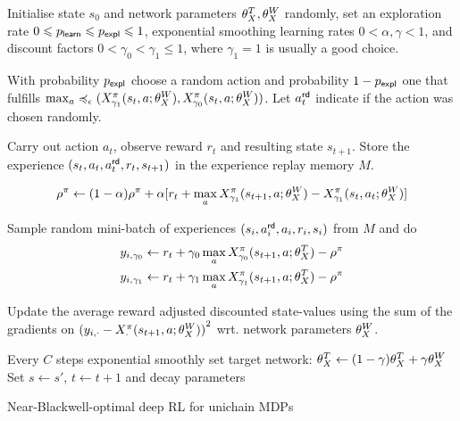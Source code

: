 \documentclass[envcountsame]{llncs}
\begin{document}
\begin{algorithm}[t!]
  \begin{algorithmic}[1]
    \State{}Initialise state \(s_{0}\) and network parameters \(\theta_X^{T}, \theta_X^{W}\) randomly, set
    an exploration rate \(0 \leqslant p_{\mathsf{learn}} \leqslant p_{\mathsf{expl}} \leqslant 1\), exponential smoothing learning rates
    \(0 < \alpha, \gamma < 1\), and discount factors
    \(0 < \gamma_{0} < \gamma_{1} \leqslant 1\), where \(\gamma_{1} = 1\) is
    usually a good choice.
    \State{}\begin{minipage}[t]{0.9\textwidth} With probability \(p_{\mathsf{expl}}\) choose a random action and
      probability \(1-p_{\mathsf{expl}}\) one that fulfills
      \(\max_{a}\preccurlyeq_{\epsilon}(X^{\pi}_{\gamma_{1}}(s_{t},a; \theta_X^{W}{}),X^\pi_ {\gamma_{0}}(s_{t},a; \theta_X^{W}{}))\). Let
      \(a_{t}^{\mathsf{rd}}\) indicate if the action was chosen randomly.
    \end{minipage}
    \State{}\begin{minipage}[t]{0.9\textwidth}
    Carry out action \(a_{t}\), observe reward \(r_{t}\) and resulting state \(s_{t+1}\).
    Store the experience \((s_{t}, a_{t}, a_{t}^{\mathsf{rd}}, r_{t}, s_{t+1})\) in the experience replay
    memory \(M\).
    \end{minipage}
    \begin{align*}
      \rho^{\pi}  \gets (1- \alpha) \rho^{\pi} + \alpha [r_{t} +
      \max_{a}X^\pi_{\gamma_1}(s_{t+1},a; \theta_X^{W}{}) - X^\pi_{\gamma_1}(s_{t},a_{t}; \theta_X^{W}{})]
    \end{align*}
    \EndIf

    \State{}Sample random mini-batch of experiences \((s_{i}, a_{i}^{\mathsf{rd}}, a_{i}, r_{i}, s_{i})\)
    from \(M\) and do
    \begin{align*}
      y_{i,\gamma_0} & \gets r_{t} + \gamma_{0} \max_{a}
                                        X^\pi_{\gamma_0}(s_{t+1},a; \theta_X^{T}{}) - \rho^{\pi} \\
      y_{i,\gamma_{1}} & \gets r_{t} + \gamma_{1} \max_{a}
                                        X^\pi_{\gamma_1}(s_{t+1},a; \theta_X^{T}{}) - \rho^{\pi}
    \end{align*}
    \State{} \begin{minipage}[t]{0.9\textwidth} Update the average reward adjusted discounted
      state-values using the sum of the gradients on \({(y_{i,\cdot} -
      X^\pi_{\cdot}(s_{t+1},a; \theta_X^{W}{}))}^{2}\) wrt. network parameters
    \(\theta_X^{W}{}\).
    \end{minipage}
    \State{} Every \(C\) steps exponential smoothly set target network:
      \(\theta_X^{T} \gets (1 - \gamma) \theta_X^{T}{} + \gamma \theta_X^{W}{}\)
    \State{} Set \(s \gets s'\), \(t \gets t+1\) and decay parameters
    \EndWhile{}
  \end{algorithmic}
  \caption{\label{alg:near}Near-Blackwell-optimal deep RL for unichain MDPs}
\end{algorithm}
\end{document}
